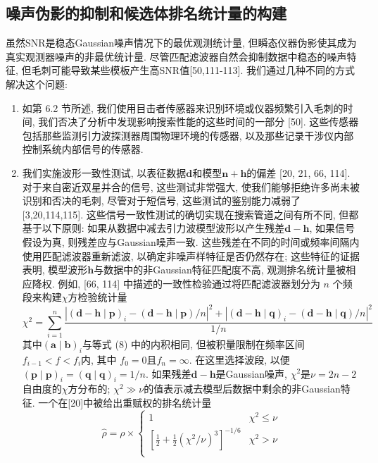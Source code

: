 \documentclass[a4paper]{\documentclassname}
\def\b{\boldsymbol}
\theoremstyle{definition}
\begin{document}
\subsection {噪声伪影的抑制和候选体排名统计量的构建}

虽然SNR是稳态Gaussian噪声情况下的最优观测统计量, 但瞬态仪器伪影使其成为真实观测器噪声的非最优统计量. 尽管匹配滤波器自然会抑制数据中稳态的噪声特征, 但毛刺可能导致某些模板产生高SNR值[50,111-113]. 我们通过几种不同的方式解决这个问题:
\begin{enumerate}
    \item 如第 6.2 节所述, 我们使用目击者传感器来识别环境或仪器频繁引入毛刺的时间, 我们否决了分析中发现影响搜索性能的这些时间的一部分 [50]. 这些传感器包括那些监测引力波探测器周围物理环境的传感器, 以及那些记录干涉仪内部控制系统内部信号的传感器. 
    \item 我们实施波形一致性测试, 以表征数据${\b{d}}$和模型${\b{n}}+{\b{h}}$的偏差 [20, 21, 66, 114]. 对于来自密近双星并合的信号, 这些测试非常强大, 使我们能够拒绝许多尚未被识别和否决的毛刺, 尽管对于短信号, 这些测试的鉴别能力减弱了[3,20,114,115].  这些信号一致性测试的确切实现在搜索管道之间有所不同, 但都基于以下原则: 如果从数据中减去引力波模型波形以产生残差${\b{d}}-{\b{h}}$, 如果信号假设为真, 则残差应与Gaussian噪声一致. 这些残差在不同的时间或频率间隔内使用匹配滤波器重新滤波, 以确定非噪声样特征是否仍然存在; 这些特征的证据表明, 模型波形${\b{h}}$与数据中的非Gaussian特征匹配度不高, 观测排名统计量被相应降权. 例如, [66,  114] 中描述的一致性检验通过将匹配滤波器划分为 $n$ 个频段来构建$\chi$方检验统计量
    \begin{equation}
        \chi^2=\sum_{i=1}^n\frac{ |({\b{d}}-{\b{h}} \mid \b{p})_i -({\b{d}}-{\b{h}} \mid \b{p})/n|^2 +|({\b{d}}-{\b{h}}\mid \b{q})_i -({\b{d}}-{\b{h}}\mid \b{q})/n|^2}{1/n}
    \end{equation}
    其中$ (\b{a}\mid\b{b}) _i$与等式 (8) 中的内积相同, 但被积量限制在频率区间$f_{i-1}<f<f_{i}$内, 其中 $f_0 = 0 $且$f_n=\infty$. 在这里选择波段, 以便$ (\b{p}\mid\b{p}) _i= (\b{q}\mid\b{q}) _i=1/n$. 如果残差${\b{d}}-{\b{h}}$是Gaussian噪声, $\chi^2$是$\nu=2n-2$自由度的$\chi$方分布的; $\chi^2\gg\nu$的值表示减去模型后数据中剩余的非Gaussian特征. 一个在[20]中被给出重赋权的排名统计量
    \begin{equation}
        \hat{\rho}=\rho\times\begin{cases}
            1 &  \chi^2 \le \nu \\
            \left[\frac{1}{2}+\frac{1}{2}(\chi^2 /\nu)^3\right]^{-1/6} &  \chi^2 > \nu \\
        \end{cases}

\end{equation}
\end{enumerate}
\end{document}
